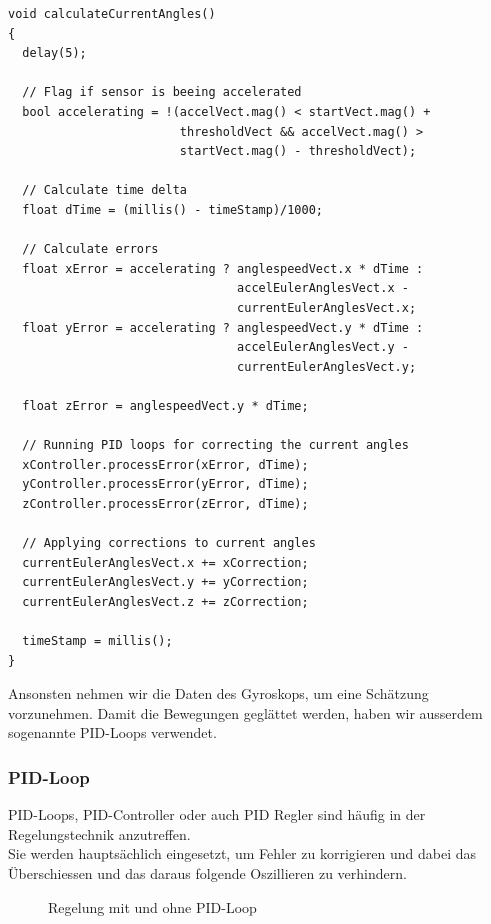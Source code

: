 \vspace{3mm}
\begin{lstlisting}
void calculateCurrentAngles()
{
  delay(5);

  // Flag if sensor is beeing accelerated
  bool accelerating = !(accelVect.mag() < startVect.mag() + 
                        thresholdVect && accelVect.mag() > 
                        startVect.mag() - thresholdVect);

  // Calculate time delta
  float dTime = (millis() - timeStamp)/1000;

  // Calculate errors
  float xError = accelerating ? anglespeedVect.x * dTime : 
                                accelEulerAnglesVect.x - 
                                currentEulerAnglesVect.x;
  float yError = accelerating ? anglespeedVect.y * dTime : 
                                accelEulerAnglesVect.y - 
                                currentEulerAnglesVect.y;

  float zError = anglespeedVect.y * dTime;

  // Running PID loops for correcting the current angles
  xController.processError(xError, dTime);
  yController.processError(yError, dTime);
  zController.processError(zError, dTime);

  // Applying corrections to current angles
  currentEulerAnglesVect.x += xCorrection;
  currentEulerAnglesVect.y += yCorrection;
  currentEulerAnglesVect.z += zCorrection;

  timeStamp = millis();
}
\end{lstlisting}  
\vspace{3mm}

Ansonsten nehmen wir die Daten des Gyroskops, um eine Schätzung vorzunehmen.
Damit die Bewegungen geglättet werden, haben wir ausserdem sogenannte PID-Loops verwendet.

\newpage
\subsubsection{PID-Loop}
PID-Loops, PID-Controller oder auch PID Regler sind häufig in der Regelungstechnik anzutreffen.\\
Sie werden hauptsächlich eingesetzt, um Fehler zu korrigieren und dabei das Überschiessen und das daraus folgende Oszillieren zu verhindern.\\

\begin{figure}[H]
\centering
{}
  \caption{Regelung mit und ohne PID-Loop}
\end{figure}


